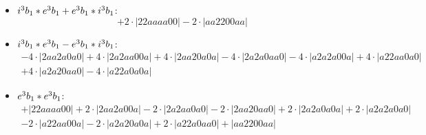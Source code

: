 \documentclass{article}
\begin{document}
\begin{itemize}
$$\begin{array}{c}
\end{array}$$
\item \boldmath$i^3 b_{1} * e^3 b_{1} + e^3 b_{1} * i^3 b_{1} \displaystyle $\unboldmath : \quad$$+2 \cdot \left|22aaaa00\right| -2 \cdot \left|aa2200aa\right|$$
\item \boldmath$i^3 b_{1} * e^3 b_{1} - e^3 b_{1} * i^3 b_{1} \displaystyle $\unboldmath : \quad$$\begin{array}{c}
-4 \cdot \left|2aa2a0a0\right| +4 \cdot \left|2a2aa00a\right| +4 \cdot \left|2aa20a0a\right| -4 \cdot \left|2a2a0aa0\right| -4 \cdot \left|a2a2a00a\right| +4 \cdot \left|a22aa0a0\right| \\[0.5cm] +4 \cdot \left|a2a20aa0\right| -4 \cdot \left|a22a0a0a\right|
\end{array}$$
\item \boldmath$e^3 b_{1} * e^3 b_{1} \displaystyle $\unboldmath : \quad$$\begin{array}{c}
+\left|22aaaa00\right| +2 \cdot \left|2aa2a00a\right| -2 \cdot \left|2a2aa0a0\right| -2 \cdot \left|2aa20aa0\right| +2 \cdot \left|2a2a0a0a\right| +2 \cdot \left|a2a2a0a0\right| \\[0.5cm] -2 \cdot \left|a22aa00a\right| -2 \cdot \left|a2a20a0a\right| +2 \cdot \left|a22a0aa0\right| +\left|aa2200aa\right|
\end{array}$$

\end{itemize}
\end{document}
